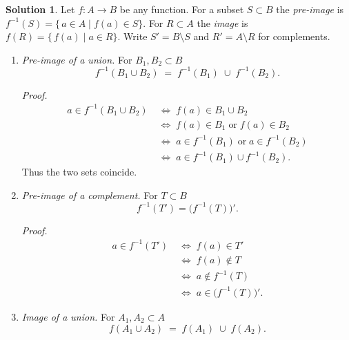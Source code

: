 \documentclass[12pt]{article}
\theoremstyle{definition} %
\newtheorem{solution}{Solution}
\theoremstyle{plain} %
\begin{document}
\begin{solution}
Let \(f:A\to B\) be any function.  
For a subset \(S\subset B\) the \emph{pre-image} is
\(f^{-1}(S)=\{\,a\in A\mid f(a)\in S\}\).
For \(R\subset A\) the \emph{image} is
\(f(R)=\{\,f(a)\mid a\in R\}\).
Write \(S' = B\setminus S\) and \(R' = A\setminus R\) for complements.

\bigskip
\begin{enumerate}[label=\textbf{(\alph*)}]
\item \textit{Pre-image of a union.}\;
      For \(B_{1},B_{2}\subset B\)
      \[
         f^{-1}(B_{1}\cup B_{2})
           \;=\;
         f^{-1}(B_{1})\;\cup\;f^{-1}(B_{2}).
      \]

      \emph{Proof.}
      \[
      \begin{aligned}
      a\in f^{-1}(B_{1}\cup B_{2})
      &\;\Longleftrightarrow\;
        f(a)\in B_{1}\cup B_{2} \\
      &\;\Longleftrightarrow\;
        f(a)\in B_{1}\;\text{or}\;f(a)\in B_{2}\\
      &\;\Longleftrightarrow\;
        a\in f^{-1}(B_{1}) \;\text{or}\; a\in f^{-1}(B_{2})\\
      &\;\Longleftrightarrow\;
        a\in f^{-1}(B_{1})\cup f^{-1}(B_{2}).
      \end{aligned}
      \]
      Thus the two sets coincide.

\item \textit{Pre-image of a complement.}\;
      For \(T\subset B\)
      \[
         f^{-1}(T') = \bigl(f^{-1}(T)\bigr)'.
      \]

      \emph{Proof.}
      \[
      \begin{aligned}
      a\in f^{-1}(T')
        &\;\Longleftrightarrow\; f(a)\in T'  \\
        &\;\Longleftrightarrow\; f(a)\notin T\\
        &\;\Longleftrightarrow\; a\notin f^{-1}(T)\\
        &\;\Longleftrightarrow\; a\in\bigl(f^{-1}(T)\bigr)'.
      \end{aligned}
      \]

\item \textit{Image of a union.}\;
      For \(A_{1},A_{2}\subset A\)
      \[
         f(A_{1}\cup A_{2})
           \;=\;
         f(A_{1})\;\cup\;f(A_{2}).
      \]


\end{enumerate}
\end{solution}
\end{document}
